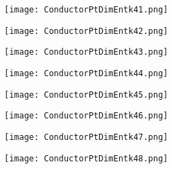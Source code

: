 \documentclass[pdf]{beamer}
\begin{document}
\begin{frame}
\begin{figure}[!h]
\centering
\texttt{[image: ConductorPtDimEntk41.png]}
\end{figure}
\end{frame}

\begin{frame}
\begin{figure}[!h]
\centering
\texttt{[image: ConductorPtDimEntk42.png]}
\end{figure}
\end{frame}

\begin{frame}
\begin{figure}[!h]
\centering
\texttt{[image: ConductorPtDimEntk43.png]}
\end{figure}
\end{frame}

\begin{frame}
\begin{figure}[!h]
\centering
\texttt{[image: ConductorPtDimEntk44.png]}
\end{figure}
\end{frame}

\begin{frame}
\begin{figure}[!h]
\centering
\texttt{[image: ConductorPtDimEntk45.png]}
\end{figure}
\end{frame}

\begin{frame}
\begin{figure}[!h]
\centering
\texttt{[image: ConductorPtDimEntk46.png]}
\end{figure}
\end{frame}

\begin{frame}
\begin{figure}[!h]
\centering
\texttt{[image: ConductorPtDimEntk47.png]}
\end{figure}
\end{frame}

\begin{frame}
\begin{figure}[!h]
\centering
\texttt{[image: ConductorPtDimEntk48.png]}
\end{figure}
\end{frame}
\end{document}
